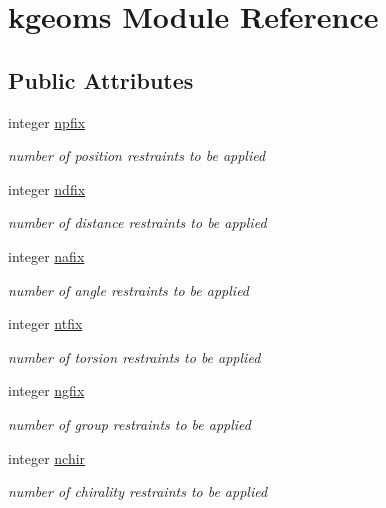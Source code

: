 \hypertarget{classkgeoms}{\section{kgeoms Module Reference}
\label{classkgeoms}
}
\subsection*{Public Attributes}
\begin{DoxyCompactItemize}
\item 
integer \hyperlink{classkgeoms_a4e638b8d3d6424e0bd535247a9341c30}{npfix}
\begin{DoxyCompactList}\small\item\em number of position restraints to be applied \end{DoxyCompactList}\item 
integer \hyperlink{classkgeoms_a85ef2631e17c98ffe2a73fe6b6747a59}{ndfix}
\begin{DoxyCompactList}\small\item\em number of distance restraints to be applied \end{DoxyCompactList}\item 
integer \hyperlink{classkgeoms_a539c42cb6c28aca001ec53b4c901268b}{nafix}
\begin{DoxyCompactList}\small\item\em number of angle restraints to be applied \end{DoxyCompactList}\item 
integer \hyperlink{classkgeoms_a9d25617fef534f2ace88078a587c6444}{ntfix}
\begin{DoxyCompactList}\small\item\em number of torsion restraints to be applied \end{DoxyCompactList}\item 
integer \hyperlink{classkgeoms_a83d5ee51e0109dd1d1447a9d7c4a68aa}{ngfix}
\begin{DoxyCompactList}\small\item\em number of group restraints to be applied \end{DoxyCompactList}\item 
integer \hyperlink{classkgeoms_a9192b7f33e91b89220617d2010ec3c4c}{nchir}
\begin{DoxyCompactList}\small\item\em number of chirality restraints to be applied \end{DoxyCompactList}\item 

\end{DoxyCompactItemize}
